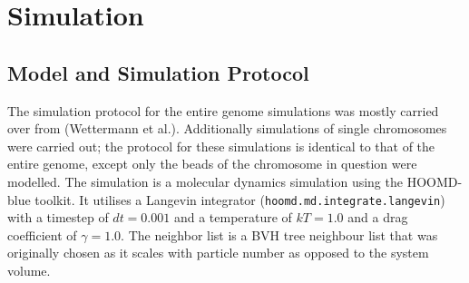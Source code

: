 
\chapter{Simulation} %
\label{cha:simulation}

\section{Model and Simulation Protocol} %
\label{sec:model_and_simulation_protocol}

The simulation protocol for the entire genome simulations was mostly carried over from (Wettermann et al.\cite{wettermann_minimal_2020}). Additionally simulations of single chromosomes were carried out; the protocol for these simulations is identical to that of the entire genome, except only the beads of the chromosome in question were modelled. The simulation is a molecular dynamics simulation using the HOOMD-blue\cite{anderson_hoomd-blue_2020} toolkit. It utilises a Langevin integrator (\verb|hoomd.md.integrate.langevin|) with a timestep of \(dt=0.001\) and a temperature of \(kT = 1.0\) and a drag coefficient of \(\gamma = 1.0\). The neighbor list is a BVH tree neighbour list \cite{howard_efficient_2016} \cite{howard_quantized_2019} that was originally chosen as it scales
with particle number as opposed to the system volume\cite{wettermann_minimal_2020}.

